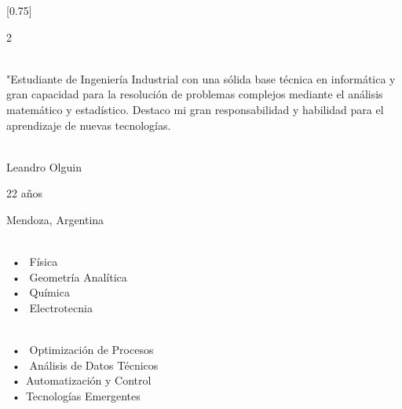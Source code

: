 \documentclass[lighthipster]{simplehipstercv}
\begin{document}
\setlength{\columnsep}{1.5cm}
[0.75]
\begin{paracol}{2}

\paracolbackgroundoptions



\footnotesize
{\setasidefontcolour
\flushright
\begin{center}
\end{center}

\\[0.5em]

{\footnotesize
"Estudiante de Ingeniería Industrial con una sólida base técnica en informática y gran capacidad para la resolución de problemas complejos mediante el análisis matemático y estadístico. Destaco mi gran responsabilidad y habilidad para el aprendizaje de nuevas tecnologías.}
\bigskip

 \\[0.5em]
Leandro Olguin

22 años

Mendoza, Argentina


\bigskip

 \\[0.5em]

~•~ Física \\
~•~ Geometría Analítica\\
~•~ Química\\ 
~•~ Electrotecnia \\

\bigskip



\bigskip

\\[0.5em]
~•~ Optimización de Procesos \\ 
~•~ Análisis de Datos Técnicos \\
~•~Automatización y Control\\
~•~Tecnologías Emergentes\\
\bigskip


\vspace{4em}


}
\end{paracol}
\end{document}
